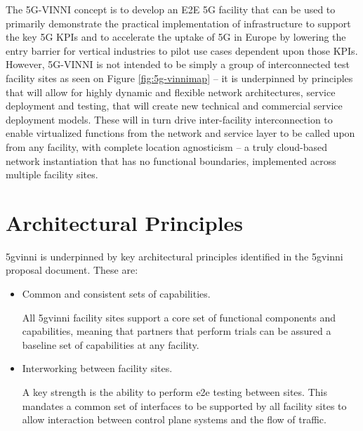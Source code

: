 The 5G-VINNI concept is to develop an E2E 5G facility that can be used to primarily demonstrate the practical implementation of infrastructure to support the key 5G KPIs and to accelerate the uptake of 5G in Europe by lowering the entry barrier for vertical industries to pilot use cases dependent upon those KPIs. However, 5G-VINNI is not intended to be simply a group of interconnected test facility sites as seen on Figure \ref{fig:5g-vinnimap} \cite{5gvinni-site-map} – it is underpinned by principles that will allow for highly dynamic and flexible network architectures, service deployment and testing, that will create new technical and commercial service deployment models. These will in turn drive inter-facility interconnection to enable virtualized functions from the network and service layer to be called upon from any facility, with complete location agnosticism – a truly cloud-based network instantiation that has no functional boundaries, implemented across multiple facility sites.



\newpage

\section{Architectural Principles}
\acrshort{5gvinni} is underpinned by key architectural principles identified in the \acrshort{5gvinni} proposal document. These are:
\begin{itemize}
    \item Common and consistent sets of capabilities. 
    
    All \acrshort{5gvinni} facility sites support a core set of functional components and capabilities, meaning that partners that perform trials can be assured a baseline set of capabilities at any facility.
    
    \item     Interworking between facility sites. 
    
    A key strength is the ability to perform \acrshort{e2e} testing between sites. This mandates a common set of interfaces to be supported by all facility sites to allow interaction between control plane systems and the flow of traffic.
\end{itemize}

